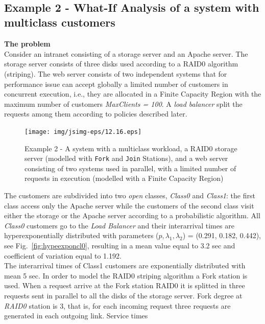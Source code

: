 \ \\
\subsection{Example 2 - What-If Analysis of a system with multiclass
customers}
\noindent \textbf{The problem}\\
 Consider an intranet consisting of a storage server and an Apache server.
 The storage server consists of three disks used according to a RAID0 algorithm
 (striping). The web server consists of two independent systems that
 for performance
 issue can accept globally a limited number of customers in concurrent execution,
 i.e., they are allocated in
 a Finite Capacity Region with the maximum number of customers
 \emph{MaxClients = 100}.
 A \emph{load balancer} split the requests among them according to
 policies described later.\\
\begin{figure}[htb]
    \begin{center}
        \texttt{[image: img/jsimg-eps/12.16.eps]}
    \end{center}
    \caption{Example 2 - A system with a multiclass workload, a
    RAID0 storage server (modelled with \texttt{Fork} and
    \texttt{Join} Stations), and a web server consisting of two
    systems used in parallel, with a limited number of
    requests in execution (modelled with a Finite Capacity Region)}
    \label{fig:mulworkex2}
\end{figure}
The customers are subdivided into two \emph{open} classes,
\emph{Class0} and \emph{Class1}: the first class access only the
Apache server while the customers of the second class visit either
the storage or the Apache server according to a probabilistic
algorithm. All \emph{Class0} customers go to the \emph{Load
Balancer} and their interarrival times are hyperexponentially
distributed with parameters ($p, \lambda_1, \lambda_2$) = (0.291,
0.182, 0.442), see Fig.~\ref{fig:hypeexponcl0}, resulting in a
mean value equal
to 3.2 sec and coefficient of variation equal to 1.192.\\
The interarrival times of Class1 customers are exponentially
distributed with mean 5 sec. In order to model the RAID0 striping
algorithm a Fork station is used. When a request arrive at the
Fork station RAID0 it is splitted in three requests sent in
parallel to all the disks of the storage server. Fork degree at
\emph{RAID0} station is 3, that is, for each incoming request
three requests are generated in each outgoing link. Service times
